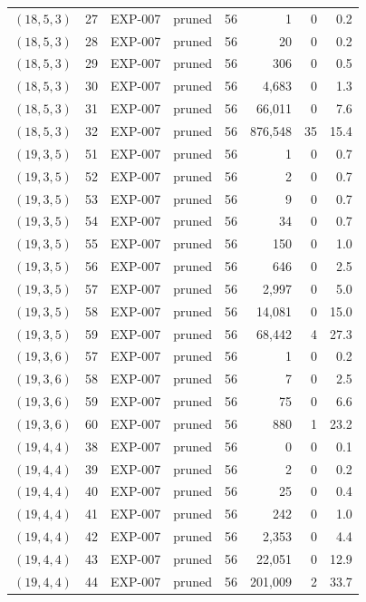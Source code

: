 \begin{longtable}{lrllrrrr}
$(18,5,3)$ & 27 & EXP-007 & pruned & 56 & 1 & 0 & 0.2 \\
$(18,5,3)$ & 28 & EXP-007 & pruned & 56 & 20 & 0 & 0.2 \\
$(18,5,3)$ & 29 & EXP-007 & pruned & 56 & 306 & 0 & 0.5 \\
$(18,5,3)$ & 30 & EXP-007 & pruned & 56 & 4{,}683 & 0 & 1.3 \\
$(18,5,3)$ & 31 & EXP-007 & pruned & 56 & 66{,}011 & 0 & 7.6 \\
$(18,5,3)$ & 32 & EXP-007 & pruned & 56 & 876{,}548 & 35 & 15.4 \\
$(19,3,5)$ & 51 & EXP-007 & pruned & 56 & 1 & 0 & 0.7 \\
$(19,3,5)$ & 52 & EXP-007 & pruned & 56 & 2 & 0 & 0.7 \\
$(19,3,5)$ & 53 & EXP-007 & pruned & 56 & 9 & 0 & 0.7 \\
$(19,3,5)$ & 54 & EXP-007 & pruned & 56 & 34 & 0 & 0.7 \\
$(19,3,5)$ & 55 & EXP-007 & pruned & 56 & 150 & 0 & 1.0 \\
$(19,3,5)$ & 56 & EXP-007 & pruned & 56 & 646 & 0 & 2.5 \\
$(19,3,5)$ & 57 & EXP-007 & pruned & 56 & 2{,}997 & 0 & 5.0 \\
$(19,3,5)$ & 58 & EXP-007 & pruned & 56 & 14{,}081 & 0 & 15.0 \\
$(19,3,5)$ & 59 & EXP-007 & pruned & 56 & 68{,}442 & 4 & 27.3 \\
$(19,3,6)$ & 57 & EXP-007 & pruned & 56 & 1 & 0 & 0.2 \\
$(19,3,6)$ & 58 & EXP-007 & pruned & 56 & 7 & 0 & 2.5 \\
$(19,3,6)$ & 59 & EXP-007 & pruned & 56 & 75 & 0 & 6.6 \\
$(19,3,6)$ & 60 & EXP-007 & pruned & 56 & 880 & 1 & 23.2 \\
$(19,4,4)$ & 38 & EXP-007 & pruned & 56 & 0 & 0 & 0.1 \\
$(19,4,4)$ & 39 & EXP-007 & pruned & 56 & 2 & 0 & 0.2 \\
$(19,4,4)$ & 40 & EXP-007 & pruned & 56 & 25 & 0 & 0.4 \\
$(19,4,4)$ & 41 & EXP-007 & pruned & 56 & 242 & 0 & 1.0 \\
$(19,4,4)$ & 42 & EXP-007 & pruned & 56 & 2{,}353 & 0 & 4.4 \\
$(19,4,4)$ & 43 & EXP-007 & pruned & 56 & 22{,}051 & 0 & 12.9 \\
$(19,4,4)$ & 44 & EXP-007 & pruned & 56 & 201{,}009 & 2 & 33.7 \\

\end{longtable}
